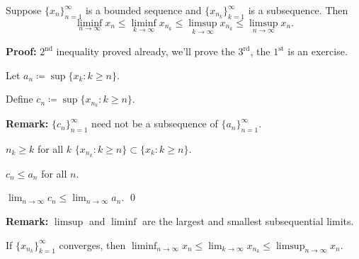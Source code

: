 \documentclass[10pt,aspectratio=169]{beamer}
\begin{document}
\begin{frame}
\begin{proposition}
Suppose $\{ x_n \}_{n=1}^\infty$ is a bounded sequence and
$\{ x_{n_k} \}_{k=1}^\infty$ is a subsequence.  Then
\begin{equation*}
\liminf_{n\to\infty} x_n \leq
\liminf_{k\to\infty} x_{n_k} \leq
\limsup_{k\to\infty} x_{n_k} \leq
\limsup_{n\to\infty} x_n .
\end{equation*}
\end{proposition}

\pause
\textbf{Proof:}
$2^{\text{nd}}$ inequality proved already,
we'll prove the $3^{\text{rd}}$,
the $1^{\text{st}}$ is an exercise.

\pause
\medskip

Let $a_n \coloneqq \sup \{ x_k : k \geq n \}$.

\pause
\medskip

Define $c_n \coloneqq \sup \{ x_{n_k} : k \geq n \}$.

\pause
\medskip

\textbf{Remark:} $\{ c_n \}_{n=1}^\infty$ need not be a subsequence of
$\{ a_n \}_{n=1}^\infty$.

\pause
\medskip

$n_k \geq k$ for all $k$ \wthus $\{ x_{n_k} : k \geq n \} \subset \{ x_k : k \geq n \}$.

\pause
\medskip

\thus \quad $c_n \leq a_n$ \quad for all $n$.

\pause
\medskip

\thus \quad
$\displaystyle \lim_{n\to\infty} c_n \leq \lim_{n\to\infty} a_n$.
\qed

\pause
\medskip

\textbf{Remark:}
$\limsup$ and $\liminf$ are the
largest and smallest subsequential limits.

\pause
If $\{ x_{n_k} \}_{k=1}^\infty$ converges, then
\quad
$\displaystyle \liminf_{n\to\infty} x_n \leq
\lim_{k\to\infty} x_{n_k} \leq
\limsup_{n\to\infty} x_n$.

\end{frame}
\end{document}
